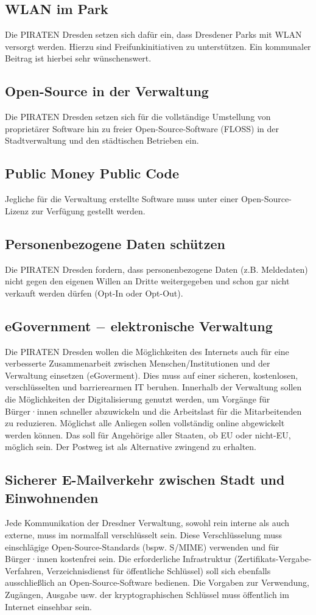 \documentclass[a4paper, 11pt]{article}
\begin{document}
\subsection{WLAN im Park}
Die PIRATEN Dresden setzen sich dafür ein, dass Dresdener Parks mit WLAN versorgt werden. Hierzu sind Freifunkinitiativen zu unterstützen. Ein kommunaler Beitrag ist hierbei sehr wünschenswert.

\subsection{Open-Source in der Verwaltung}
Die PIRATEN Dresden setzen sich für die vollständige Umstellung von proprietärer Software hin zu freier Open-Source-Software (FLOSS) in der Stadtverwaltung und den städtischen Betrieben ein.

\subsection{Public Money Public Code}
Jegliche für die Verwaltung erstellte Software muss unter einer Open-Source-Lizenz zur Verfügung gestellt werden.

\subsection{Personenbezogene Daten schützen}
Die PIRATEN Dresden fordern, dass personenbezogene Daten (z.B. Meldedaten) nicht gegen den eigenen Willen an Dritte weitergegeben und schon gar nicht verkauft werden dürfen (Opt-In oder Opt-Out).

\subsection{eGovernment $-$ elektronische Verwaltung}
Die PIRATEN Dresden wollen die Möglichkeiten des Internets auch für eine verbesserte Zusammenarbeit zwischen Menschen/Institutionen und der Verwaltung einsetzen (eGoverment). Dies muss auf einer sicheren, kostenlosen, verschlüsselten und barrierearmen IT beruhen. Innerhalb der Verwaltung sollen die Möglichkeiten der Digitalisierung genutzt werden, um Vorgänge für Bürger·innen schneller abzuwickeln und die Arbeitslast für die Mitarbeitenden zu reduzieren. Möglichst alle Anliegen sollen vollständig online abgewickelt werden können. Das soll für Angehörige aller Staaten, ob EU oder nicht-EU, möglich sein. Der Postweg ist als Alternative zwingend zu erhalten.

\subsection{Sicherer E-Mailverkehr zwischen Stadt und Einwohnenden}
Jede Kommunikation der Dresdner Verwaltung, sowohl rein interne als auch externe, muss im normalfall verschlüsselt sein. Diese Verschlüsselung muss einschlägige Open-Source-Standards (bspw. S/MIME) verwenden und für Bürger·innen kostenfrei sein. Die erforderliche Infrastruktur (Zertifikats-Vergabe-Verfahren, Verzeichnisdienst für öffentliche Schlüssel) soll sich ebenfalls ausschließlich an Open-Source-Software bedienen. Die Vorgaben zur Verwendung, Zugängen, Ausgabe usw. der kryptographischen Schlüssel muss öffentlich im Internet einsehbar sein.
\end{document}
